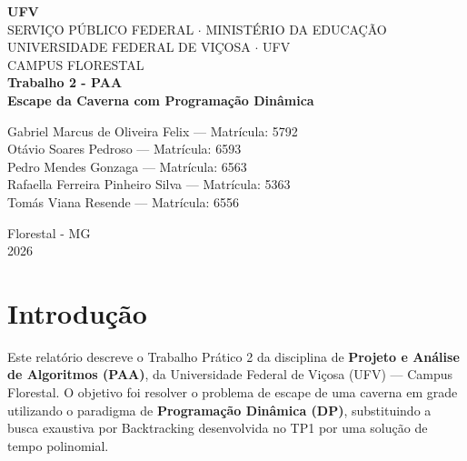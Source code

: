 \documentclass[12pt,a4paper]{article}
\makeatletter
\DeclareRobustCommand{\_}{%
  \ifmmode
    \nfss@text{\textunderscore}%
  \else
    \textunderscore\allowbreak
  \fi
}
\makeatother
\begin{document}
 
\thispagestyle{empty}
\begin{center}
    {\fontsize{38}{42}\selectfont \textbf{\textsf{\textcolor[RGB]{25,25,25}{U}\hspace{1pt}\textcolor[RGB]{150,20,20}{F}\hspace{1pt}\textcolor[RGB]{200,140,20}{V}}}}\\[0.25cm]
    {\normalsize SERVIÇO PÚBLICO FEDERAL $\cdot$ MINISTÉRIO DA EDUCAÇÃO}\\[0.12cm]
    {\normalsize UNIVERSIDADE FEDERAL DE VIÇOSA $\cdot$ UFV}\\[0.12cm]
    {\normalsize CAMPUS FLORESTAL}\\[4.8cm]
 
    {\large \textbf{Trabalho 2 - PAA}}\\[0.3cm]
    {\large \textbf{Escape da Caverna com Programação Dinâmica}}\\[0.3cm]
    
 
    \begin{flushright}
        Gabriel Marcus de Oliveira Felix --- Matrícula: 5792 \\
        Otávio Soares Pedroso --- Matrícula: 6593 \\
        Pedro Mendes Gonzaga --- Matrícula: 6563 \\
        Rafaella Ferreira Pinheiro Silva --- Matrícula: 5363 \\
        Tomás Viana Resende --- Matrícula: 6556
    \end{flushright}
 
    \vfill
    {\normalsize Florestal - MG}\\[0.12cm]
    {\normalsize 2026}
\end{center}
 
\newpage
\tableofcontents
\thispagestyle{fancy}

\newpage
\setcounter{page}{2}
 

\section{Introdução}

Este relatório descreve o Trabalho Prático 2 da disciplina de \textbf{Projeto e Análise de Algoritmos (PAA)}, da Universidade Federal de Viçosa (UFV) --- Campus Florestal. O objetivo foi resolver o problema de escape de uma caverna em grade utilizando o paradigma de \textbf{Programação Dinâmica (DP)}, substituindo a busca exaustiva por Backtracking desenvolvida no TP1 por uma solução de tempo polinomial.
\end{document}
